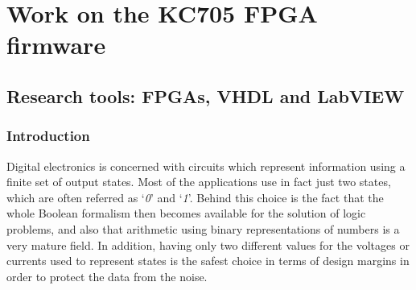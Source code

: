 \part{Work on the KC705 FPGA firmware}

\chapter{Research tools: FPGAs, VHDL and LabVIEW}
\section{Introduction}
\noindent Digital electronics is concerned with circuits which represent information using a finite set of output
states. Most of the applications use in fact just two states, which are often referred as ‘\textit{0}’ and ‘\textit{1}’.
Behind this choice is the fact that the whole Boolean formalism then becomes available for the
solution of logic problems, and also that arithmetic using binary representations of numbers is a very
mature field\cite{fpga1}.
\newline
In addition, having only two different values for the voltages or currents used to represent states is the safest choice in terms of
design margins in order to protect the data from the noise.



